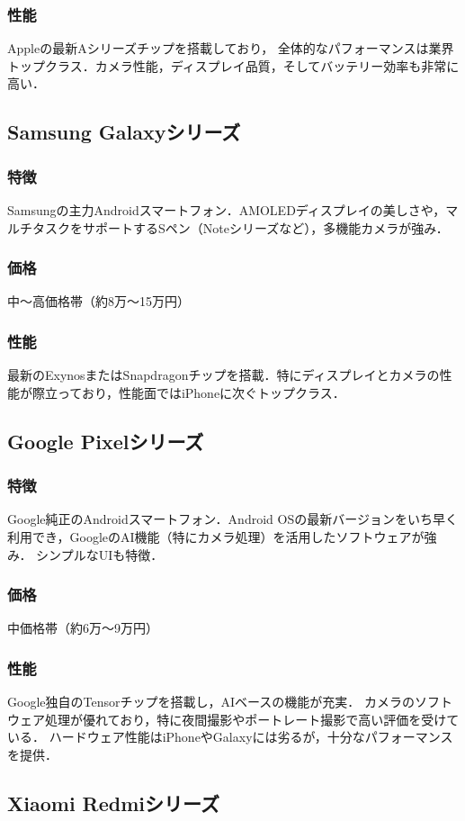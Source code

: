 \documentclass[titlepage,a4paper]{jsarticle}
\begin{document}
\subsubsection{性能}
Appleの最新Aシリーズチップを搭載しており，
全体的なパフォーマンスは業界トップクラス．カメラ性能，ディスプレイ品質，そしてバッテリー効率も非常に高い．
\subsection{Samsung Galaxyシリーズ}
\subsubsection{特徴}
Samsungの主力Androidスマートフォン．AMOLEDディスプレイの美しさや，マルチタスクをサポートするSペン（Noteシリーズなど），多機能カメラが強み．
\subsubsection{価格}
中～高価格帯（約8万～15万円）
\subsubsection{性能}
最新のExynosまたはSnapdragonチップを搭載．特にディスプレイとカメラの性能が際立っており，性能面ではiPhoneに次ぐトップクラス．
\subsection{Google Pixelシリーズ}
\subsubsection{特徴}
Google純正のAndroidスマートフォン．Android OSの最新バージョンをいち早く利用でき，GoogleのAI機能（特にカメラ処理）を活用したソフトウェアが強み．
シンプルなUIも特徴．
\subsubsection{価格}
中価格帯（約6万～9万円）
\subsubsection{性能}
Google独自のTensorチップを搭載し，AIベースの機能が充実．
カメラのソフトウェア処理が優れており，特に夜間撮影やポートレート撮影で高い評価を受けている．
ハードウェア性能はiPhoneやGalaxyには劣るが，十分なパフォーマンスを提供．
\subsection{Xiaomi Redmiシリーズ}
\end{document}

